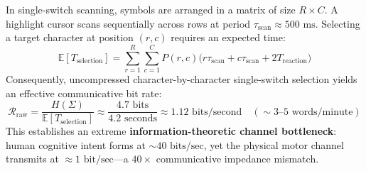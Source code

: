 \documentclass[11pt,letterpaper]{article}
\begin{document}
In single-switch scanning, symbols are arranged in a matrix of size $R \times C$. A highlight cursor scans sequentially across rows at period $\tau_{\text{scan}} \approx 500\text{ ms}$. Selecting a target character at position $(r, c)$ requires an expected time:
\begin{equation}
\mathbb{E}[T_{\text{selection}}] = \sum_{r=1}^R \sum_{c=1}^C P(r, c) \Big( r \tau_{\text{scan}} + c \tau_{\text{scan}} + 2 T_{\text{reaction}} \Big)
\end{equation}
Consequently, uncompressed character-by-character single-switch selection yields an effective communicative bit rate:
\begin{equation}
\mathcal{R}_{\text{raw}} = \frac{H(\Sigma)}{\mathbb{E}[T_{\text{selection}}]} \approx \frac{4.7\text{ bits}}{4.2\text{ seconds}} \approx 1.12\text{ bits/second} \quad (\sim 3\text{--}5\text{ words/minute})
\end{equation}
This establishes an extreme \textbf{information-theoretic channel bottleneck}: human cognitive intent forms at $\sim 40\text{ bits/sec}$, yet the physical motor channel transmits at $\approx 1\text{ bit/sec}$---a $40\times$ communicative impedance mismatch.

\begin{table}[htbp]
\centering
{}
\caption{Assistive Communication Channel Physics: severe motor impairments collapse physical channel degrees of freedom, throttling information transmission rates by over an order of magnitude unless augmented by predictive language models.}
\label{tab:aac_rates}
\end{table}
\end{document}
